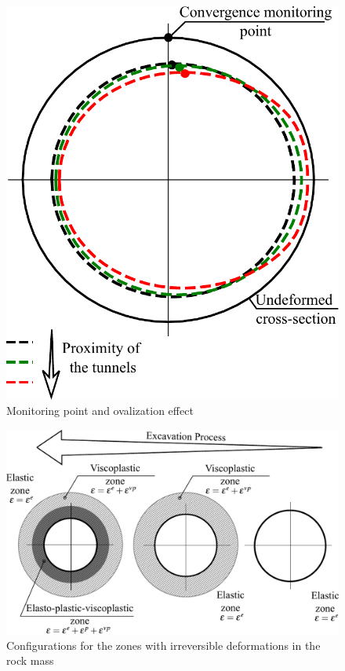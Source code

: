 \documentclass[a4paper,fleqn]{cas-sc}
\begin{document}
\begin{figure}[h!]
	\centering
	\includegraphics[scale=0.6]{Ovalization effect and monitoring point.pdf}
	\caption{Monitoring point and ovalization effect}
	\label{Ovalization effect and monitoring point}
\end{figure}
\FloatBarrier
\begin{figure}[h!]
	\centering
	\includegraphics[scale=0.6]{zones.pdf}
	\caption{Configurations for the zones with irreversible deformations in the rock mass}
	\label{zones}
\end{figure}
\end{document}
